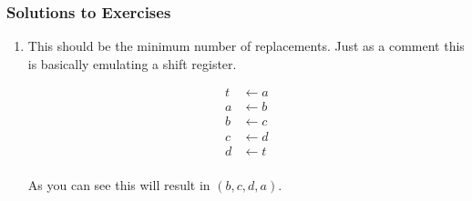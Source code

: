 \documentclass[../../main.tex]{subfiles}
\begin{document}
  \subsubsection{Solutions to Exercises}
    \begin{enumerate}
      \item This should be the minimum number of replacements. Just as a comment this
      is basically emulating a shift register.

        \begin{equation*}
          \begin{split}
            t &\leftarrow a\\
            a &\leftarrow b\\
            b &\leftarrow c\\
            c &\leftarrow d\\
            d &\leftarrow t\\
          \end{split}
        \end{equation*}

        As you can see this will result in $(b,c,d,a)$.

    \end{enumerate}
\end{document}
